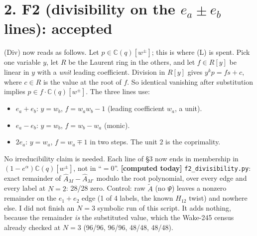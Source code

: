 \documentclass[10pt]{article}
\newcommand{\At}{\tilde A}
\newcommand{\Ah}{\widehat A}
\begin{document}
\section*{2. F2 (divisibility on the $e_a\pm e_b$ lines): accepted}
(Div) now reads as follows. Let $p\in\mathbb C(q)[w^\pm]$; this is where (L) is spent. Pick one variable $y$, let $R$ be the Laurent ring in the others, and let $f\in R[y]$ be linear in $y$ with
a \emph{unit} leading coefficient. Division in $R[y]$ gives $y^kp=fs+c$, where $c\in R$ is the value at the root of $f$. So identical vanishing after substitution implies
$p\in f\cdot\mathbb C(q)[w^\pm]$. The three lines use:
\begin{itemize}
\item $e_a+e_b$: $y=w_b$, $f=w_aw_b-1$ (leading coefficient $w_a$, a unit).
\item $e_a-e_b$: $y=w_b$, $f=w_b-w_a$ (monic).
\item $2e_a$: $y=w_a$, $f=w_a\mp1$ in two steps. The unit $2$ is the coprimality.
\end{itemize}
No irreducibility claim is needed. Each line of \S3 now ends in membership in $(1-e^\alpha)\mathbb C(q)[w^\pm]$, not in ``$=0$''.
\textbf{[computed today]} \texttt{f2\_divisibility.py}: exact remainder of $\Ah_M-\Ah_{M'}$ modulo the root polynomial, over every edge and every label at $N=2$: 28/28 zero.
Control: raw $\At$ (no $\Psi$) leaves a nonzero remainder on the $e_1+e_2$ edge (1 of 4 labels, the known $H_{12}$ twist) and nowhere else.
I did not finish an $N=3$ symbolic run of this script. It adds nothing, because the remainder \emph{is} the substituted value, which the Wake-245 census already checked at $N=3$ (96/96, 96/96, 48/48, 48/48).
\end{document}
